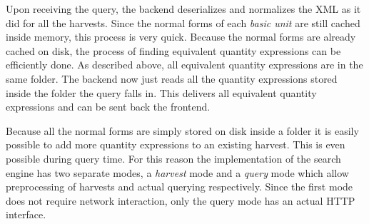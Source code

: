 Upon receiving the query, the backend deserializes and normalizes the XML as it did for all the harvests. Since the normal forms of each \textit{basic unit} are still cached inside memory, this process is very quick. Because the normal forms are already cached on disk, the process of finding equivalent quantity expressions can be efficiently done. As described above, all equivalent quantity expressions are in the same folder. The backend now just reads all the quantity expressions stored inside the folder the query falls in. This delivers all equivalent quantity expressions and can be sent back the frontend.

Because all the normal forms are simply stored on disk inside a folder it is easily possible to add more quantity expressions to an existing harvest. This is even possible during query time. For this reason the implementation of the search engine has two separate modes, a \textit{harvest} mode and a \textit{query} mode which allow preprocessing of harvests and actual querying respectively. Since the first mode does not require network interaction, only the query mode has an actual HTTP interface.
